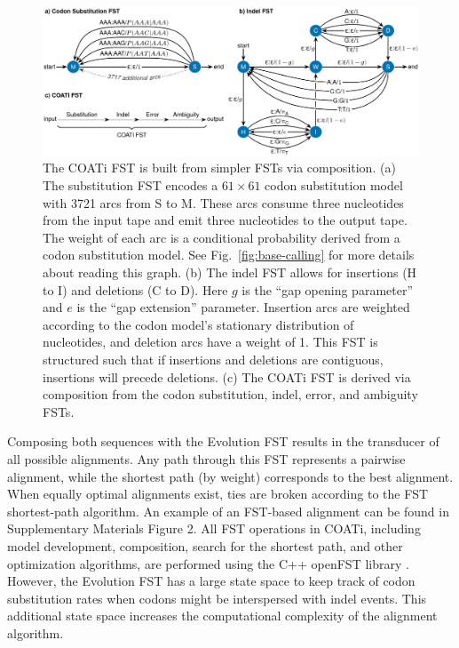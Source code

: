 \documentclass[12pt,letterpaper]{article}
\begin{document}
\begin{figure}[h!]
\includegraphics[width=\textwidth]{figures/fig-fst-coati.pdf}
\caption{The COATi FST is built from simpler FSTs via composition.
(a) The substitution FST encodes a $61 \times 61 $ codon substitution model with 3721 arcs from S to M. These arcs consume three nucleotides from the input tape and emit three nucleotides to the output tape. The weight of each arc is a conditional probability derived from a codon substitution model. See Fig.~\ref{fig:base-calling} for more details about reading this graph.
%
(b) The indel FST allows for insertions (H to I) and deletions (C to D). Here $g$ is the ``gap opening parameter'' and $e$ is the ``gap extension'' parameter.
Insertion arcs are weighted according to the codon model's stationary distribution of nucleotides, and deletion arcs have a weight of 1. This FST is structured such that if insertions and deletions are contiguous, insertions will precede deletions.
%
(c) The COATi FST is derived via composition from the codon substitution, indel, error, and ambiguity FSTs.
}
\label{fig:coati-fst}
\end{figure}

Composing both sequences with the Evolution FST results in the transducer of all possible alignments.
Any path through this FST represents a pairwise alignment, while the shortest path (by weight) corresponds to the best alignment.
When equally optimal alignments exist, ties are broken according to the FST shortest-path algorithm.
An example of an FST-based alignment can be found in Supplementary Materials Figure 2.
All FST operations in COATi, including model development, composition, search for the shortest path, and other optimization algorithms, are performed using the C++ openFST library \citep{allauzen2007openfst}.
However, the Evolution FST has a large state space to keep track of codon substitution rates when codons might be interspersed with indel events. This additional state space increases the computational complexity of the alignment algorithm.
\end{document}
